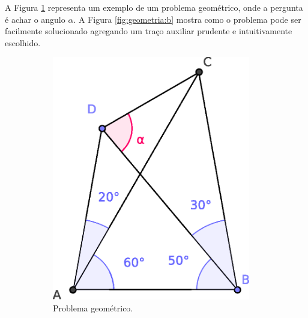 \begin{itemize}
\begin{example}
A Figura \ref{fig:geometria:a} representa um exemplo de um problema geométrico, 
onde a pergunta é achar o angulo $\alpha$. 
A Figura \ref{fig:geometria:b} mostra
como o problema pode ser facilmente solucionado agregando um traço auxiliar 
prudente e intuitivamente escolhido.
\end{example}
\begin{figure}[!h]
  \centering
     \begin{subfigure}[b]{0.4\textwidth}
         \centering
         \includegraphics[width=0.95\textwidth]{chapters/cap-learning/prob-geometria1.eps} 
         \caption{Problema geométrico.}
         \label{fig:geometria:a}
     \end{subfigure}
     \hfill
     \begin{subfigure}[b]{0.4\textwidth}
         \centering

\end{subfigure}
\end{figure}
\end{itemize}
